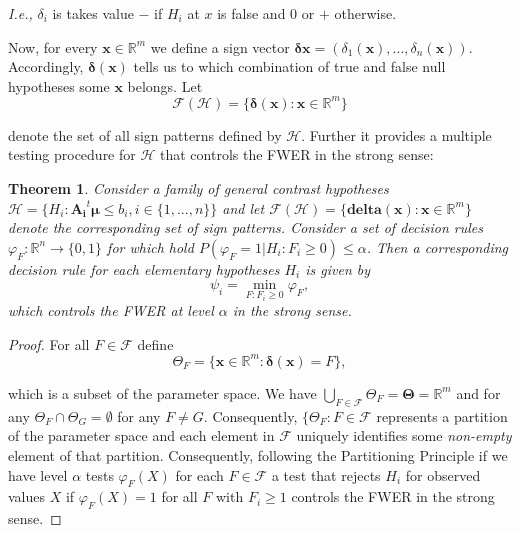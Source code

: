 \documentclass[a4paper,12pt]{article}
\newtheorem{theorem}{Theorem}
\newcommand{\bs}[1]{\boldsymbol{#1}}
\newcommand{\R}{\mathbb{R}}
\begin{document}
{\em I.e.,} $\delta_i$ is takes value $-$ if $H_i$ at $x$ is false and
$0$ or $+$ otherwise.

Now, for every $\bs{x} \in \mathbb{R}^m$ we define a sign vector
$\bs{\delta}{\bs{x}}=
(\delta_1(\bs{x}),...,\delta_n(\bs{x}))$. Accordingly,
$\bs{\delta}(\bs{x})$ tells us to which 
combination of true and false null hypotheses some $\bs{x}$
belongs. Let
\begin{equation}
\label{eq:faces}
\mathcal{F}(\mathscr{H}) = \{\bs{\delta}(\bs{x}): \bs{x} \in \R^m\}
\end{equation}

denote the set of all sign patterns defined by 
$\mathscr{H}$.  Further it
provides a multiple testing procedure for $\mathscr{H}$ that controls
the FWER in the strong sense:

\begin{theorem}
  Consider a family of general contrast hypotheses $\mathscr{H} =
  \{H_i: \bs{A_i}^t\bs{\mu} \leq b_i,i \in \{1,...,n\}\}$ and let
  $\mathscr{F}(\mathscr{H}) = \{ \bs{delta}(\bs{x}): \bs{x} \in
  \R^m\}$ denote the corresponding set of sign patterns. Consider a
  set of decision rules $\varphi_F: \R^n \rightarrow \{0,1\}$ for
  which hold $P(\varphi_F = 1 | H_i: F_i \geq 0) \leq \alpha$. Then a
  corresponding decision rule for each elementary hypotheses $H_i$ is
  given by 
  \begin{equation}
    \label{eq:signtest}
    \psi_i = \min_{F: F_i \geq 0} \varphi_F,
  \end{equation}
  which controls the FWER at level $\alpha$ in the strong sense. 
\end{theorem}


\begin{proof}
  For all $F \in \mathcal{F}$ define
  \begin{equation}
    \label{eq:partition}
    \Theta_F = \{\bs{x} \in \R^m: \bs{\delta}(\bs{x}) = F\},
  \end{equation}

  which is a subset of the parameter space. We have $\bigcup_{F \in
    \mathcal{F}} \Theta_F = \bs{\Theta} = \R^m$ and for any $\Theta_F
  \cap \Theta_G = \emptyset$ for any $F \neq G$. Consequently,
  $\{\Theta_F:F \in \mathcal{F}$ represents a partition of the
  parameter space and each element in $\mathcal{F}$ uniquely
  identifies some {\em non-empty} element of that
  partition. Consequently, following the Partitioning Principle
  \cite[]{finner2002partitioning} if we have level $\alpha$ tests
  $\varphi_F(X)$ for each $F \in \mathcal{F}$ a test that rejects
  $H_i$ for observed values $X$ if $\varphi_F(X) = 1$ for all $F$ with
  $F_i \geq 1$ controls the FWER in the strong sense.
\end{proof}
\end{document}
